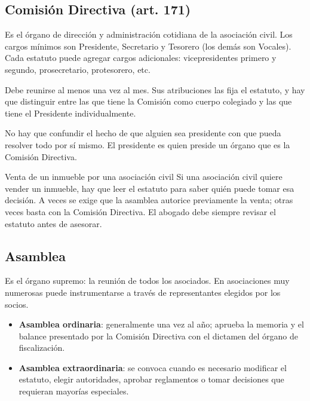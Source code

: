 \documentclass[12pt,oneside]{book}
\begin{document}
\subsection{Comisión Directiva (art. 171)}

Es el órgano de dirección y administración cotidiana de la asociación civil. Los cargos mínimos son Presidente, Secretario y Tesorero (los demás son Vocales). Cada estatuto puede agregar cargos adicionales: vicepresidentes primero y segundo, prosecretario, protesorero, etc.

Debe reunirse al menos una vez al mes. Sus atribuciones las fija el estatuto, y hay que distinguir entre las que tiene la Comisión como cuerpo colegiado y las que tiene el Presidente individualmente.

\begin{important}
No hay que confundir el hecho de que alguien sea presidente con que pueda resolver todo por sí mismo. El presidente es quien preside un órgano que es la Comisión Directiva.
\end{important}

\begin{example}{Venta de un inmueble por una asociación civil}
Si una asociación civil quiere vender un inmueble, hay que leer el estatuto para saber quién puede tomar esa decisión. A veces se exige que la asamblea autorice previamente la venta; otras veces basta con la Comisión Directiva. El abogado debe siempre revisar el estatuto antes de asesorar.
\end{example}

\subsection{Asamblea}

Es el órgano supremo: la reunión de todos los asociados. En asociaciones muy numerosas puede instrumentarse a través de representantes elegidos por los socios.

\begin{itemize}
    \item \textbf{Asamblea ordinaria}: generalmente una vez al año; aprueba la memoria y el balance presentado por la Comisión Directiva con el dictamen del órgano de fiscalización.
    \item \textbf{Asamblea extraordinaria}: se convoca cuando es necesario modificar el estatuto, elegir autoridades, aprobar reglamentos o tomar decisiones que requieran mayorías especiales.
\end{itemize}
\end{document}
